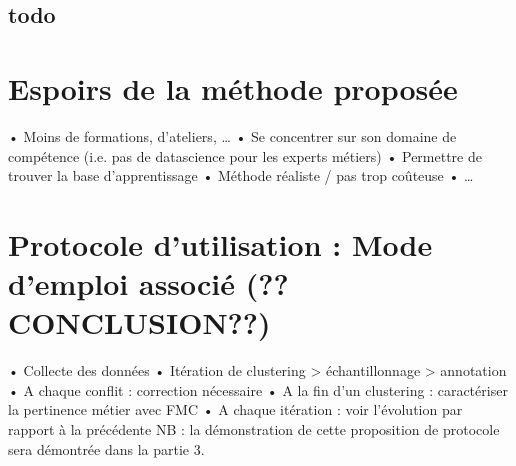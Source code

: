 		\subsection{todo}

    
    \section{Espoirs de la méthode proposée}

        •	Moins de formations, d’ateliers, …
        •	Se concentrer sur son domaine de compétence (i.e. pas de datascience pour les experts métiers)
        •	Permettre de trouver la base d’apprentissage
        •	Méthode réaliste / pas trop coûteuse
        •	…
 
    
    \section{Protocole d'utilisation : Mode d'emploi associé (??CONCLUSION??)}

        •	Collecte des données
        •	Itération de clustering > échantillonnage > annotation
        •	A chaque conflit : correction nécessaire
        •	A la fin d’un clustering : caractériser la pertinence métier avec FMC
        •	A chaque itération : voir l’évolution par rapport à la précédente
        NB : la démonstration de cette proposition de protocole sera démontrée dans la partie 3.